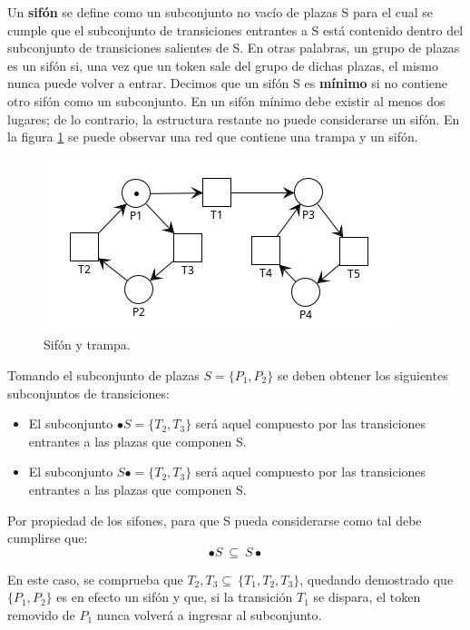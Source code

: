 Un \textbf{sifón} se define como un subconjunto no vacío de plazas S para el cual se cumple que el subconjunto de transiciones entrantes a S está contenido dentro del subconjunto de transiciones salientes de S.
En otras palabras, un grupo de plazas es un sifón si, una vez que un token sale del grupo de dichas plazas, el mismo nunca puede volver a entrar. 
Decimos que un sifón S es \textbf{mínimo} si no contiene otro sifón como un subconjunto. En un sifón mínimo debe existir al menos dos lugares; de lo contrario, la estructura restante no puede considerarse un sifón.
En la figura \ref{fig:rdp2.6-sifontrampa} se puede observar una red que contiene una trampa y un sifón.

\begin{figure}[H]
	\centering
	\includegraphics[scale=1.00]{Figures/marco teorico/imag6.png}
	\caption{Sifón y trampa.}
	\label{fig:rdp2.6-sifontrampa}
  \end{figure}
  
Tomando el subconjunto de plazas $S = \{P_1 , P_2 \}$ se deben obtener los siguientes subconjuntos de transiciones:
\begin{itemize}
    \item El subconjunto $\bullet S = \{T_2, T_3 \}$ será aquel compuesto por las transiciones entrantes a las plazas que componen S.
    \item El subconjunto $S \bullet = \{T_2, T_3\} $ será aquel compuesto por las transiciones entrantes a las plazas que componen S.
\end{itemize}

\noindent Por propiedad de los sifones, para que S pueda considerarse como tal debe cumplirse que:
\begin{equation}
    \bullet S \ \subseteq \ S \bullet 
\end{equation}

En este caso, se comprueba que ${T_2 , T_3} \subseteq \ \{T_1 , T_2 , T_3 \}$, quedando demostrado que $\{P_1,P_2\}$ es en efecto un sifón y que, si la transición $T_1$ se dispara, el token removido de $P_1$ nunca volverá a ingresar al subconjunto. \\ \par

